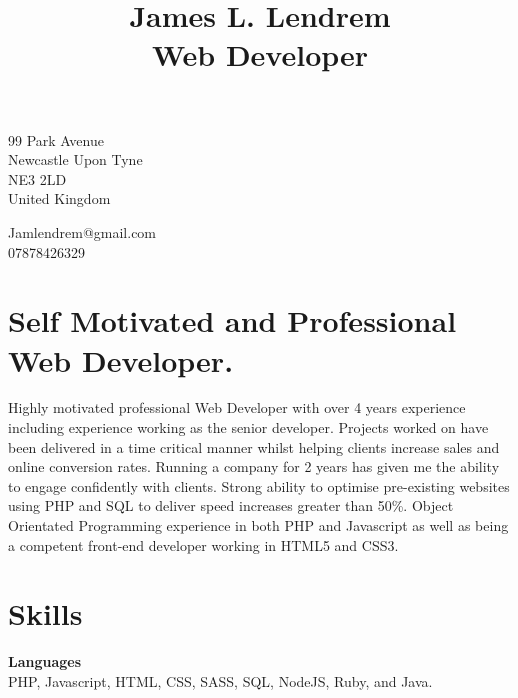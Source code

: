 \documentclass[10pt]{article}
\title{\bfseries\Huge James L. Lendrem \\ Web Developer}
\date{}
\begin{document}
\maketitle

\begin{minipage}[t]{0.48\textwidth}
99 Park Avenue\\
Newcastle Upon Tyne\\
NE3 2LD\\
United Kingdom
\end{minipage}
\begin{minipage}[t]{0.48\textwidth}
\begin{flushright}
Jamlendrem@gmail.com\\
07878426329
\end{flushright}
\end{minipage}

\newcommand\VRule{\color{lightgray}\vrule width 0.5pt}

\section*{Self Motivated and Professional Web Developer.}
Highly motivated professional Web Developer with over 4 years experience including experience working as the senior developer. Projects worked on have been delivered in a time critical manner whilst helping clients increase sales and online conversion rates. Running a company for 2 years has given me the ability to engage confidently with clients. Strong ability to optimise pre-existing websites using PHP and SQL to deliver speed increases greater than 50\%. Object Orientated Programming experience in both PHP and Javascript as well as being a competent front-end developer working in HTML5 and CSS3.

\section*{Skills}
{\bf Languages}\\
PHP, Javascript, HTML, CSS, SASS, SQL, NodeJS, Ruby, and Java.
\end{document}
